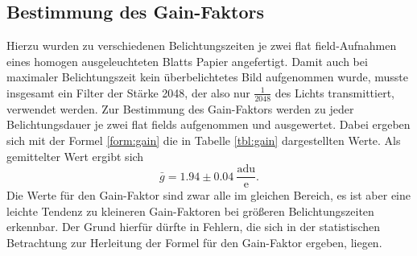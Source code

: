\subsection{Bestimmung des Gain-Faktors}
Hierzu wurden zu verschiedenen Belichtungszeiten je zwei flat field-Aufnahmen eines homogen ausgeleuchteten Blatts Papier angefertigt.
Damit auch bei maximaler Belichtungszeit kein überbelichtetes Bild aufgenommen wurde, musste insgesamt ein Filter der Stärke 2048, der also nur $\frac{1}{2048}$ des Lichts transmittiert, verwendet werden. 
Zur Bestimmung des Gain-Faktors werden zu jeder Belichtungsdauer je zwei flat fields aufgenommen und ausgewertet. Dabei ergeben sich mit der Formel \eqref{form:gain} die in Tabelle \ref{tbl:gain} dargestellten Werte. Als gemittelter Wert ergibt sich 
\begin{equation}
\bar{g} = 1.94 \pm 0.04 \ \frac{\mathrm{adu}}{\mathrm{e}}. 
\end{equation}
Die Werte für den Gain-Faktor sind zwar alle im gleichen Bereich, es ist aber eine leichte Tendenz zu kleineren Gain-Faktoren bei größeren Belichtungszeiten erkennbar. Der Grund hierfür dürfte in Fehlern, die sich in der statistischen Betrachtung zur Herleitung der Formel für den Gain-Faktor ergeben, liegen. 

